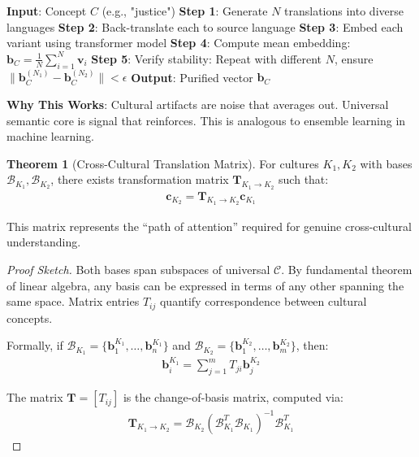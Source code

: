 \documentclass[11pt,a4paper]{article}
\theoremstyle{definition}
\newtheorem{theorem}{Theorem}[section]
\theoremstyle{remark}
\newcommand{\CC}{\mathcal{C}}
\newcommand{\bb}{\mathbf{b}}
\newcommand{\cc}{\mathbf{c}}
\newcommand{\TT}{\mathbf{T}}
\begin{document}
\begin{small}
\begin{mdframed}[backgroundcolor=green!10,linewidth=2pt]
\begin{algorithmic}[1]
\State \textbf{Input}: Concept \(C\) (e.g., "justice")
\State \textbf{Step 1}: Generate \(N\) translations into diverse languages
\State \textbf{Step 2}: Back-translate each to source language
\State \textbf{Step 3}: Embed each variant using transformer model
\State \textbf{Step 4}: Compute mean embedding: \(\bb_C = \frac{1}{N} \sum_{i=1}^N \mathbf{v}_i\)
\State \textbf{Step 5}: Verify stability: Repeat with different \(N\), ensure \(\|\bb_C^{(N_1)} - \bb_C^{(N_2)}\| < \epsilon\)
\State \textbf{Output}: Purified vector \(\bb_C\)
\end{algorithmic}

\textbf{Why This Works}: Cultural artifacts are noise that averages out. Universal semantic core is signal that reinforces. This is analogous to ensemble learning in machine learning.
\end{mdframed}

\begin{theorem}[Cross-Cultural Translation Matrix]
For cultures \(K_1, K_2\) with bases \(\mathcal{B}_{K_1}, \mathcal{B}_{K_2}\), there exists transformation matrix \(\TT_{K_1 \to K_2}\) such that:
\begin{align}
\cc_{K_2} = \TT_{K_1 \to K_2} \cc_{K_1}
\end{align}

This matrix represents the ``path of attention'' required for genuine cross-cultural understanding.
\end{theorem}

\begin{proof}[Proof Sketch]
Both bases span subspaces of universal \(\CC\). By fundamental theorem of linear algebra, any basis can be expressed in terms of any other spanning the same space. Matrix entries \(T_{ij}\) quantify correspondence between cultural concepts.

Formally, if \(\mathcal{B}_{K_1} = \{\bb_1^{K_1}, \ldots, \bb_n^{K_1}\}\) and \(\mathcal{B}_{K_2} = \{\bb_1^{K_2}, \ldots, \bb_m^{K_2}\}\), then:
\begin{align}
\bb_i^{K_1} = \sum_{j=1}^m T_{ji} \bb_j^{K_2}
\end{align}

The matrix \(\TT = [T_{ij}]\) is the change-of-basis matrix, computed via:
\begin{align}
\TT_{K_1 \to K_2} = \mathcal{B}_{K_2} (\mathcal{B}_{K_1}^T \mathcal{B}_{K_1})^{-1} \mathcal{B}_{K_1}^T
\end{align}


\end{proof}
\end{small}
\end{document}
